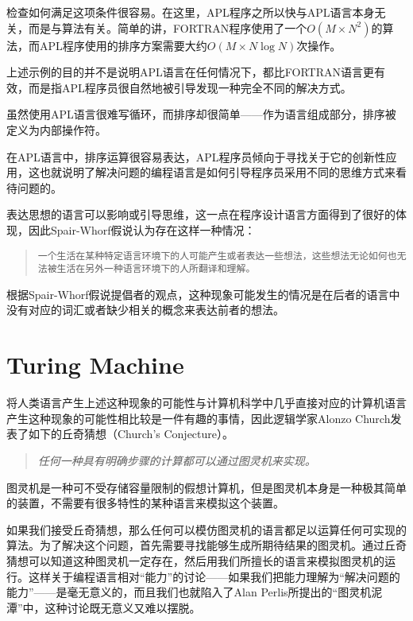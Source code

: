 检查如何满足这项条件很容易。在这里，APL程序之所以快与APL语言本身无关，而是与算法有关。简单的讲，FORTRAN程序使用了一个$O(M\times N^2)$的算法，而APL程序使用的排序方案需要大约$O(M\times N\log N)$次操作。


上述示例的目的并不是说明APL语言在任何情况下，都比FORTRAN语言更有效，而是指APL程序员很自然地被引导发现一种完全不同的解决方式。

虽然使用APL语言很难写循环，而排序却很简单——作为语言组成部分，排序被定义为内部操作符。

在APL语言中，排序运算很容易表达，APL程序员倾向于寻找关于它的创新性应用，这也就说明了解决问题的编程语言是如何引导程序员采用不同的思维方式来看待问题的。

表达思想的语言可以影响或引导思维，这一点在程序设计语言方面得到了很好的体现，因此Spair-Whorf假说认为存在这样一种情况：

\begin{quote}
\texttt{一个生活在某种特定语言环境下的人可能产生或者表达一些想法，这些想法无论如何也无法被生活在另外一种语言环境下的人所翻译和理解。}
\end{quote}

根据Spair-Whorf假说提倡者的观点，这种现象可能发生的情况是在后者的语言中没有对应的词汇或者缺少相关的概念来表达前者的想法。


\section{Turing Machine}

将人类语言产生上述这种现象的可能性与计算机科学中几乎直接对应的计算机语言产生这种现象的可能性相比较是一件有趣的事情，因此逻辑学家Alonzo Church发表了如下的丘奇猜想（Church's Conjecture）。


\begin{quote}
\emph{任何一种具有明确步骤的计算都可以通过图灵机来实现。}
\end{quote}





图灵机是一种可不受存储容量限制的假想计算机，但是图灵机本身是一种极其简单的装置，不需要有很多特性的某种语言来模拟这个装置。

如果我们接受丘奇猜想，那么任何可以模仿图灵机的语言都足以运算任何可实现的算法。为了解决这个问题，首先需要寻找能够生成所期待结果的图灵机。通过丘奇猜想可以知道这种图灵机一定存在，然后用我们所擅长的语言来模拟图灵机的运行。这样关于编程语言相对“能力”的讨论——如果我们把能力理解为“解决问题的能力”——是毫无意义的，而且我们也就陷入了Alan Perlis所提出的“图灵机泥潭”中，这种讨论既无意义又难以摆脱。



